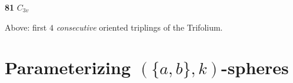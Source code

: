 \documentclass{beamer}
\begin{document}
\begin{frame}
\begin{center}
\begin{minipage}[b]{20mm}
{\bf 81} $C_{3v}$\end{minipage}
Above: first $4$ {\em consecutive} oriented triplings of the Trifolium.
\end{center}

\end{frame}


\section[]{Parameterizing  $(\{a,b\},k)$-spheres}

\end{document}
